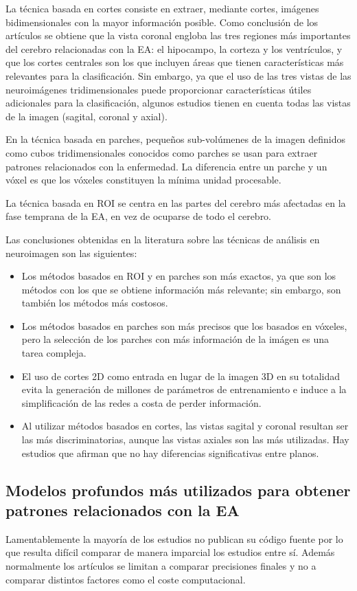 La técnica basada en cortes consiste en extraer, mediante cortes, imágenes bidimensionales con la mayor información
posible.
Como conclusión de los artículos se obtiene que la vista coronal engloba las tres regiones más importantes del cerebro
relacionadas con la EA: el hipocampo, la corteza y los ventrículos, y que los cortes centrales son los que incluyen
áreas que tienen características más relevantes para la clasificación.
Sin embargo, ya que el uso de las tres vistas de las neuroimágenes tridimensionales puede proporcionar características
útiles adicionales para la clasificación, algunos estudios tienen en cuenta todas las vistas de la imagen (sagital,
coronal y axial).

En la técnica basada en parches, pequeños sub-volúmenes de la imagen definidos como cubos tridimensionales conocidos
como parches se usan para extraer patrones relacionados con la enfermedad.
La diferencia entre un parche y un vóxel es que los vóxeles constituyen la mínima unidad procesable.

La técnica basada en ROI se centra en las partes del cerebro más afectadas en la fase temprana de la EA, en vez de
ocuparse de todo el cerebro.

Las conclusiones obtenidas en la literatura sobre las técnicas de análisis en neuroimagen son las siguientes:
\begin{itemize}
    \item Los métodos basados en ROI y en parches son más exactos, ya que son los métodos con los que se obtiene
    información más relevante;
    sin embargo, son también los métodos más costosos.
    \item Los métodos basados en parches son más precisos que los basados en vóxeles, pero la selección de los parches
    con más información de la imágen es una tarea compleja.
    \item El uso de cortes 2D como entrada en lugar de la imagen 3D en su totalidad evita la generación de millones de
    parámetros de entrenamiento e induce a la simplificación de las redes a costa de perder información.
    \item Al utilizar métodos basados en cortes, las vistas sagital y coronal resultan ser las más discriminatorias,
    aunque las vistas axiales son las más utilizadas.
    Hay estudios que afirman que no hay diferencias significativas entre planos.\\
\end{itemize}

\subsection{Modelos profundos más utilizados para obtener patrones relacionados con la EA}
\label{subsec:modelos-profundos-estado-del-arte}
Lamentablemente la mayoría de los estudios no publican su código fuente por lo que resulta difícil comparar de manera
imparcial los estudios entre sí.
Además normalmente los artículos se limitan a comparar precisiones finales y no a comparar distintos factores como el
coste computacional.

